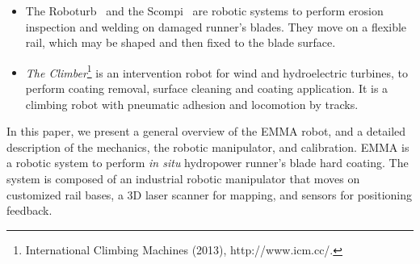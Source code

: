 \begin{itemize}
\item The Roboturb~\cite{roboturb} and the Scompi~\cite{scompi} are robotic
systems to perform erosion inspection and welding on damaged runner's blades.
They move on a flexible rail, which may be shaped and then fixed to the blade
surface.

\item \textit{The Climber}\footnote{International Climbing Machines (2013),
http://www.icm.cc/.} %
 is an intervention robot for wind and hydroelectric turbines, to perform
coating removal, surface cleaning and coating application. It is a climbing
robot with pneumatic adhesion and locomotion by tracks.
\end{itemize}

In this paper, we present a general overview of the EMMA robot, and a detailed
description of the mechanics, the robotic manipulator, and calibration. EMMA is
a robotic system to perform \textit{in situ} hydropower runner's blade hard
coating. The system is composed of an industrial robotic manipulator that moves
on customized rail bases, a 3D laser scanner for mapping, and sensors for positioning
feedback. 
\begin{comment}
The system operate in a confined space, move
on a sloping and slippery environment through a rail, identify the runner's
blades, calibrate its position, generate the path planning and perform the hard
coating. 


This text is organized as follows: a general overview of the robot and its main
challenges are presented in Section \ref{sec:general_overview}, detailed
descriptions of the embedded electronics, the vehicle support system, power
supply system, and software architecture are taken in
Sections \ref{sec:electronics_overview}, \ref{sec:powersupply_overview}, and
\ref{sec:software} respectively.
In Section \ref{sec:results}, preliminary results are shown, and concluding
remarks are drawn in Section \ref{sec:conclusions}.
\end{comment}